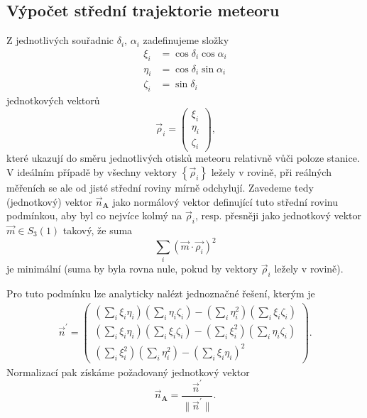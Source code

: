 \subsection{Výpočet střední trajektorie meteoru}%
Z jednotlivých souřadnic $\delta_i,\,\alpha_i$ zadefinujeme složky
\begin{equation}
    \begin{aligned}
        \xi_i   & =\cos{\delta_i}\cos{\alpha_i} \\
        \eta_i  & =\cos{\delta_i}\sin{\alpha_i} \\
        \zeta_i & =\sin{\delta_i}
    \end{aligned}
\end{equation}
jednotkových vektorů
$$
    \vec{\rho}_i=\begin{pmatrix}
        \xi_i \\\eta_i\\\zeta_i
    \end{pmatrix}\text{,}
$$
které ukazují do směru jednotlivých otisků meteoru relativně vůči poloze stanice. V ideálním případě by všechny vektory $\left\{\vec{\rho}_i\right\}$ ležely v rovině, při reálných měřeních se ale od jisté střední roviny mírně odchylují. Zavedeme tedy (jednotkový) vektor $\vec{n}_\mathbf{A}$ jako normálový vektor definující tuto střední rovinu podmínkou, aby byl co nejvíce kolmý na $\vec{\rho}_i$, resp. přesněji jako jednotkový vektor $\vec{m}\in S_3(1)$ takový, že suma
$$
    \sum_{i}{\left( \vec{m}\cdot\vec{\rho_i} \right)^2}
$$
je minimální \cite{ceplecha} (suma by byla rovna nule, pokud by vektory $\vec{\rho}_i$ ležely v rovině).

Pro tuto podmínku lze analyticky nalézt jednoznačné řešení, kterým je \cite{ceplecha}
\begin{equation}
    \begin{aligned}
        \vec{n}^\prime=\begin{pmatrix}
                           \left( \sum_{i}{\xi_i\eta_i} \right)\left( \sum_{i}{\eta_i\zeta_i} \right)-\left( \sum_{i}{\eta_i^2} \right)\left( \sum_{i}{\xi_i\zeta_i} \right) \\
                           \left( \sum_{i}{\xi_i\eta_i} \right)\left( \sum_{i}{\xi_i\zeta_i} \right)-\left( \sum_{i}{\xi_i^2} \right)\left( \sum_{i}{\eta_i\zeta_i} \right)  \\
                           \left( \sum_{i}{\xi_i^2} \right)\left( \sum_{i}{\eta_i^2} \right)-\left( \sum_{i}{\xi_i\eta_i} \right)^2
                       \end{pmatrix}\text{.}
    \end{aligned}
\end{equation}
Normalizací pak získáme požadovaný jednotkový vektor
\begin{equation}
    \vec{n}_\mathbf{A}=\frac{\vec{n}^\prime}{\lVert \vec{n}^\prime \rVert }\text{.}
\end{equation}

